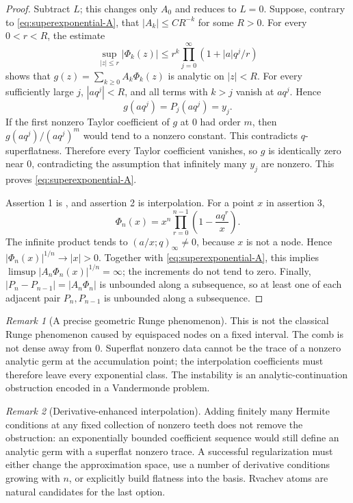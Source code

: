 \documentclass[11pt,a4paper,oneside]{article}
\theoremstyle{definition}
\theoremstyle{remark}
\newtheorem{remark}[remark]{Remark}
\begin{document}
\begin{proof}
Subtract $L$; this changes only $A_0$ and reduces to $L=0$.  Suppose, contrary
to \eqref{eq:superexponential-A}, that $|A_k|\le CR^{-k}$ for some $R>0$.
For every $0<r<R$, the estimate
\[
 \sup_{|z|\le r}|\Phi_k(z)|
 \le r^k\prod_{j=0}^\infty(1+|a|q^j/r)
\]
shows that $g(z)=\sum_{k\ge0}A_k\Phi_k(z)$ is analytic on $|z|<R$.
For every sufficiently large $j$, $|aq^j|<R$, and all terms with $k>j$
vanish at $aq^j$.  Hence
\[
 g(aq^j)=P_j(aq^j)=y_j.
\]
If the first nonzero Taylor coefficient of $g$ at $0$ had order $m$, then
$g(aq^j)/(aq^j)^m$ would tend to a nonzero constant.  This contradicts
$q$-superflatness.  Therefore every Taylor coefficient vanishes, so $g$ is
identically zero near $0$, contradicting the assumption that infinitely many
$y_j$ are nonzero.  This proves \eqref{eq:superexponential-A}.

Assertion 1 is , and assertion 2 is interpolation.
For a point $x$ in assertion 3,
\begin{equation}
 \Phi_n(x)=x^n\prod_{r=0}^{n-1}\left(1-\frac{aq^r}{x}\right).
 \label{eq:basis-fixed-x}
\end{equation}
The infinite product tends to $(a/x;q)_\infty\ne0$, because $x$ is not a
node.  Hence $|\Phi_n(x)|^{1/n}\to|x|>0$.  Together with
\eqref{eq:superexponential-A}, this implies
\(
 \limsup|A_n\Phi_n(x)|^{1/n}=\infty
\); the increments do not tend to zero.  Finally,
$|P_n-P_{n-1}|=|A_n\Phi_n|$ is unbounded along a subsequence, so at least one
of each adjacent pair $P_n,P_{n-1}$ is unbounded along a subsequence.
\end{proof}

\begin{remark}[A precise geometric Runge phenomenon]
This is not the classical Runge phenomenon caused by equispaced nodes on a
fixed interval.  The comb is not dense away from $0$.  Superflat nonzero data
cannot be the trace of a nonzero analytic germ at the accumulation point;
the interpolation coefficients must therefore leave every exponential class.
The instability is an analytic-continuation obstruction encoded in a
Vandermonde problem.
\end{remark}

\begin{remark}[Derivative-enhanced interpolation]
Adding finitely many Hermite conditions at any fixed collection of nonzero
teeth does not remove the obstruction: an exponentially bounded coefficient
sequence would still define an analytic germ with a superflat nonzero trace.
A successful regularization must either change the approximation space, use a
number of derivative conditions growing with $n$, or explicitly build
flatness into the basis.  Rvachev atoms are natural candidates for the last
option.
\end{remark}
\end{document}
